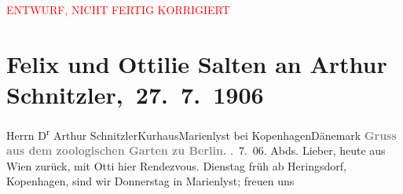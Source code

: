 
\begin{center}
            \textcolor{red}{ENTWURF, NICHT FERTIG KORRIGIERT}
                      \end{center}
            
         
         \renewcommand{\erwaehntePersonen}{Personen: Felix Salten, Ottilie Salten, Olga Schnitzler, Heinrich Schnitzler}
         \renewcommand{\erwaehnteOrte}{Orte: Berlin, Charlottenburg, Dänemark, Helsingør, Heringsdorf, Kopenhagen, Kurhotellet, Marienlyst, Wien, Zoologischer Garten Berlin}
         \renewcommand{\erwaehnteWerke}{}
               \section[ Felix und Ottilie Salten an Arthur Schnitzler, 27. 7. 1906]{ Felix und Ottilie Salten an Arthur Schnitzler, 27. 7. 1906}\nopagebreak{}\rehead{ }\begin{ledgroupsized}[t]{13cm}\normalsize\beginnumbering \toendnotes[C]{\smallbreak\pagebreak[2]} 
\toendnotes[C]{\smallbreak}\pstart{}{\pb}Herrn D\textsuperscript{r} Arthur Schnitzler\pend{}\pstart{}Kurhaus\pend{}\pstart{}Marienlyst bei Kopenhagen\pend{}\pstart{}Dänemark\pend{}{\bigskip}\pstart
           \noindent{}\centering{}{\pb}\textcolor{gray}{\textbf{Gruss aus dem zoologischen
                        Garten zu Berlin.}}\pend
           . 7. 06.\pend
           \pstart
           Abds.\pend
           \pstart
           Lieber, heute aus Wien zurück, mit Otti hier Rendezvous. Dienstag{ }früh ab Heringsdorf, Kopenhagen, sind wir Donnerstag in Marienlyst; freuen uns

\end{ledgroupsized}
